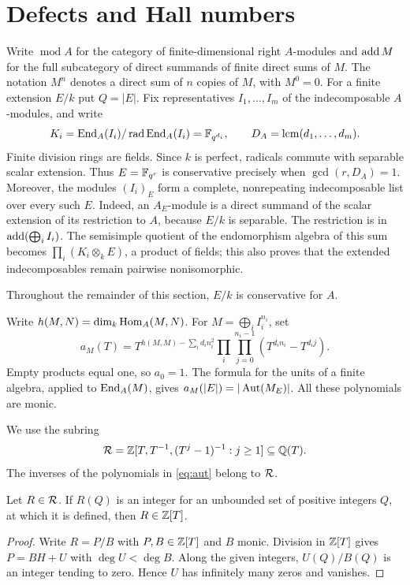 \section{Defects and Hall numbers}\label{sec:defects}
Write $\operatorname{mod}A$ for the category of finite-dimensional right $A$-modules and $\operatorname{add} M$ for the full subcategory of direct summands of finite direct sums of $M$. The notation $M^n$ denotes a direct sum of $n$ copies of $M$, with $M^0=0$. For a finite extension $E/k$ put $Q=|E|$. Fix representatives $I_1,\ldots,I_m$ of the indecomposable $A$-modules, and write
\[
 K_i=\operatorname{End}_A(I_i)/\operatorname{rad}\operatorname{End}_A(I_i)=\mathbb F_{q^{d_i}},\qquad
 D_A=\operatorname{lcm}(d_1,\ldots,d_m).
\]
Finite division rings are fields. Since $k$ is perfect, radicals commute with separable scalar extension. Thus $E=\mathbb F_{q^r}$ is conservative precisely when $\gcd(r,D_A)=1$. Moreover, the modules $(I_i)_E$ form a complete, nonrepeating indecomposable list over every such $E$. Indeed, an $A_E$-module is a direct summand of the scalar extension of its restriction to $A$, because $E/k$ is separable. The restriction is in $\operatorname{add}(\bigoplus_i I_i)$. The semisimple quotient of the endomorphism algebra of this sum becomes $\prod_i(K_i\otimes_kE)$, a product of fields; this also proves that the extended indecomposables remain pairwise nonisomorphic.

Throughout the remainder of this section, $E/k$ is conservative for $A$.

Write $h(M,N)=\dim_k\operatorname{Hom}_A(M,N)$. For $M=\bigoplus_i I_i^{n_i}$, set
\begin{equation}\label{eq:aut}
 a_M(T)=T^{h(M,M)-\sum_i d_i n_i^2}
 \prod_i\prod_{j=0}^{n_i-1}(T^{d_i n_i}-T^{d_i j}).
\end{equation}
Empty products equal one, so $a_0=1$. The formula for the units of a finite algebra, applied to $\operatorname{End}_A(M)$, gives $a_M(|E|)=|\operatorname{Aut}(M_E)|$. All these polynomials are monic.

We use the subring
\[
 \mathcal R=\mathbb Z[T,T^{-1},(T^j-1)^{-1}:j\ge1]\subseteq\mathbb Q(T).
\]
The inverses of the polynomials in \eqref{eq:aut} belong to $\mathcal R$.

\begin{lemma}\label{lem:integer}
Let $R\in\mathcal R$. If $R(Q)$ is an integer for an unbounded set of positive integers $Q$, at which it is defined, then $R\in\mathbb Z[T]$.
\end{lemma}
\begin{proof}
Write $R=P/B$ with $P,B\in\mathbb Z[T]$ and $B$ monic. Division in $\mathbb Z[T]$ gives $P=BH+U$ with $\deg U<\deg B$. Along the given integers, $U(Q)/B(Q)$ is an integer tending to zero. Hence $U$ has infinitely many zeros and vanishes.
\end{proof}

